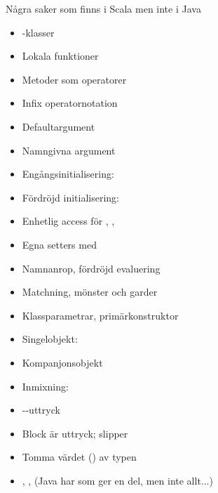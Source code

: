 \begin{Slide}{Några saker som finns i Scala men inte i Java}\SlideFontTiny
\ifkompendium\else
\vspace{-1em}\begin{multicols}{2}
\fi
\begin{itemize}
\item {}-klasser

\item Lokala funktioner

\item Metoder som operatorer

\item Infix operatornotation

\item Defaultargument

\item Namngivna argument

\item Engångsinitialisering: 

\item Fördröjd initialisering: 

\item Enhetlig access för , , 

\item Egna setters med 

\item Namnanrop, fördröjd evaluering

\item Matchning, mönster och garder

\item Klassparametrar, primärkonstruktor

\item Singelobjekt: 

\item Kompanjonsobjekt

\item Inmixning: 

\item {}--uttryck

\item Block är uttryck; slipper 

\item Tomma värdet () av typen 

\item {}, ,   (Java har  som ger en del, men inte allt...)


\end{itemize}
\end{multicols}
\end{Slide}
